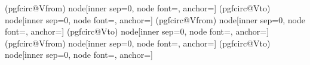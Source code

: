 {            \else
                (pgfcirc@Vfrom) node[inner sep=0, node font=\pgf@circ@avfont,
                    anchor=\pgf@circ@bipole@voltage@label@anchor]{\pgf@circ@avminus}
                (pgfcirc@Vto) node[inner sep=0, node font=\pgf@circ@avfont,
                    anchor=\pgf@circ@bipole@voltage@label@anchor]{\pgf@circ@avplus}
            \fi
            \else
            \ifpgf@circ@oldvoltagedirection
                (pgfcirc@Vfrom) node[inner sep=0, node font=\pgf@circ@avfont,
                    anchor=\pgf@circ@bipole@voltage@label@anchor]{\pgf@circ@avminus}
                (pgfcirc@Vto) node[inner sep=0, node font=\pgf@circ@avfont,
                    anchor=\pgf@circ@bipole@voltage@label@anchor]{\pgf@circ@avplus}
            \else
                (pgfcirc@Vfrom) node[inner sep=0, node font=\pgf@circ@avfont,
                    anchor=\pgf@circ@bipole@voltage@label@anchor]{\pgf@circ@avplus}
                (pgfcirc@Vto) node[inner sep=0, node font=\pgf@circ@avfont,
                    anchor=\pgf@circ@bipole@voltage@label@anchor]{\pgf@circ@avminus}
            \fi
        \fi
    \fi
}




